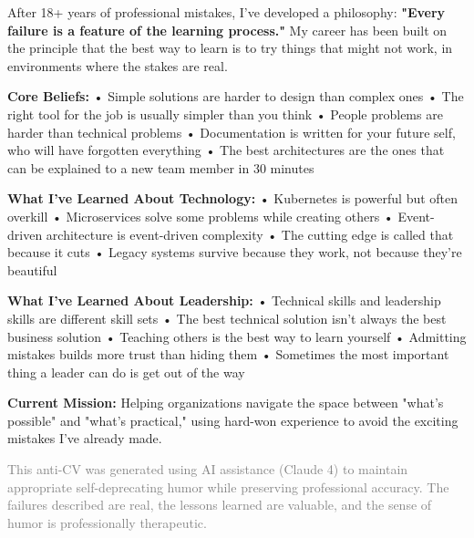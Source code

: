 \documentclass[10pt,a4paper]{article}
\begin{document}
After 18+ years of professional mistakes, I've developed a philosophy: \textbf{"Every failure is a feature of the learning process."} My career has been built on the principle that the best way to learn is to try things that might not work, in environments where the stakes are real.

\textbf{Core Beliefs:}
• Simple solutions are harder to design than complex ones
• The right tool for the job is usually simpler than you think
• People problems are harder than technical problems
• Documentation is written for your future self, who will have forgotten everything
• The best architectures are the ones that can be explained to a new team member in 30 minutes

\textbf{What I've Learned About Technology:}
• Kubernetes is powerful but often overkill
• Microservices solve some problems while creating others
• Event-driven architecture is event-driven complexity
• The cutting edge is called that because it cuts
• Legacy systems survive because they work, not because they're beautiful

\textbf{What I've Learned About Leadership:}
• Technical skills and leadership skills are different skill sets
• The best technical solution isn't always the best business solution
• Teaching others is the best way to learn yourself
• Admitting mistakes builds more trust than hiding them
• Sometimes the most important thing a leader can do is get out of the way

\textbf{Current Mission:} Helping organizations navigate the space between "what's possible" and "what's practical," using hard-won experience to avoid the exciting mistakes I've already made.

\vfill

\begin{center}
\textcolor{gray}{\small This anti-CV was generated using AI assistance (Claude 4) to maintain appropriate self-deprecating humor while preserving professional accuracy. The failures described are real, the lessons learned are valuable, and the sense of humor is professionally therapeutic.}
\end{center}
\end{document}
